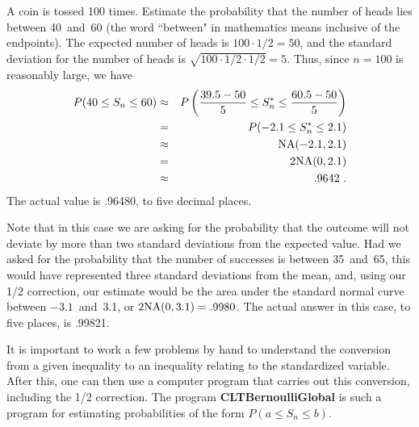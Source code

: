 \begin{example}\label{exam 9.2}
A coin is tossed 100 times.  Estimate the probability that the number of heads
lies between 40~and~60 (the word ``between" in mathematics means inclusive of the endpoints).  The
expected number of heads is
$100
\cdot 1/2 = 50$, and the standard deviation for the number of heads is $\sqrt{100 \cdot 1/2
\cdot 1/2} = 5$.  Thus, since $n = 100$ is reasonably large, we have
\begin{eqnarray*}
P(40 \le S_n \le 60) &\approx& 
P\left( \frac {39.5 - 50}5 \le S_n^* \le \frac {60.5 - 50}5 \right) \\
                     &=& P(-2.1 \le S_n^* \le 2.1) \\
                     &\approx& {\rm NA}(-2.1,2.1) \\ 
                     &=& 2{\rm NA}(0,2.1) \\
                     &\approx& .9642\ .  
\end{eqnarray*}
The actual value is .96480, to five decimal places.
\par
Note that in this case we are asking for the probability that the outcome will
not deviate by more than two standard deviations from the expected value.  Had
we asked for the probability that the number of successes is between 35~and~65,
this would have represented three standard deviations from the mean, and, using our 1/2
correction, our estimate would be the area under the standard normal curve between $-3.1$~and~3.1, 
or $2{\rm NA}(0,3.1) = .9980$.  The actual answer in this case, to five places, is .99821.  
\end{example}


It is important to work a few problems by hand to understand the conversion
from a given inequality to an inequality relating to the standardized
variable.  After this, one can then use a computer program that carries out
this conversion, including the 1/2 correction.  The program {\bf
CLTBernoulliGlobal} is such a program for estimating probabilities of the
form
$P(a \leq S_n \leq b)$.


